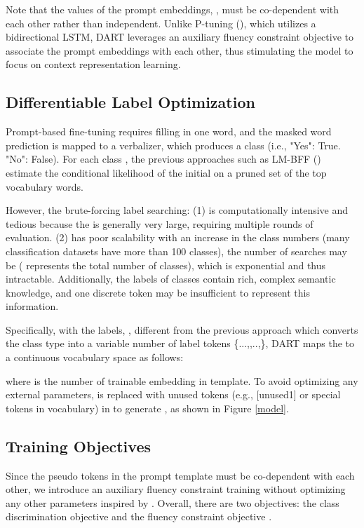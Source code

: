 \documentclass{article} \usepackage{iclr2022_conference,times}
\begin{document}
Note that the values of the prompt embeddings, , must be co-dependent with each other rather than independent.
Unlike P-tuning (\cite{DBLP:journals/corr/abs-2103-10385}), which utilizes a bidirectional LSTM, DART leverages an auxiliary fluency constraint objective to associate the prompt embeddings with each other, thus stimulating the model to focus on context representation learning. 

\subsection{Differentiable Label Optimization}
\label{optsec2}

Prompt-based fine-tuning requires filling in one word, and the masked word prediction is mapped to a verbalizer, which produces a class (i.e., "Yes": True. "No": False).
For each class , the previous approaches such as LM-BFF (\cite{DBLP:journals/corr/abs-2012-15723}) estimate the conditional likelihood of the initial   on a pruned set   of the top  vocabulary words.

However, the brute-forcing label searching:
(1) is computationally intensive and tedious because the  is generally very large, requiring multiple rounds of evaluation.
(2) has poor scalability with an increase in the class numbers (many classification datasets have more than 100 classes), the number of searches may be  ( represents the total number of classes), which is exponential and thus intractable.
Additionally, the labels of classes contain rich, complex semantic knowledge, and one discrete token may be insufficient to represent this information.

Specifically, with the labels,
, different from the previous approach which converts the class type \text{} into a variable number of label tokens \{...,\text{},..,\}, DART maps the \text{} to a continuous vocabulary space as follows:

where  is the number of trainable embedding in template.
To avoid optimizing any external parameters,  is replaced with unused tokens (e.g., [unused1] or special tokens in vocabulary) in  to generate , as shown in Figure \ref{model}.

\subsection{Training Objectives}
\label{object}

Since the pseudo tokens in the prompt template must be co-dependent with each other, we introduce an auxiliary fluency constraint training without optimizing any other parameters inspired by  \cite{DBLP:journals/corr/abs-2103-10385,DBLP:journals/corr/abs-2103-11955}.
Overall, there are two objectives: the class discrimination objective  and the fluency constraint objective .
\end{document}
